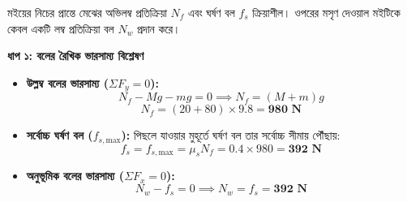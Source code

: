 \documentclass[12pt, a4paper]{article}
\begin{document}
\vspace{1em}


\begin{tcolorbox}[solutionbox={সমাধান (Solution)}]
\noindent
মইয়ের নিচের প্রান্তে মেঝের অভিলম্ব প্রতিক্রিয়া $N_f$ এবং ঘর্ষণ বল $f_s$ ক্রিয়াশীল। ওপরের মসৃণ দেওয়াল মইটিকে কেবল একটি লম্ব প্রতিক্রিয়া বল $N_w$ প্রদান করে।

\vspace{0.5em}
\noindent
\textbf{ধাপ ১: বলের রৈখিক ভারসাম্য বিশ্লেষণ} \\
\begin{itemize}[leftmargin=*, parsep=0.4ex]
    \item \textbf{উল্লম্ব বলের ভারসাম্য ($\Sigma F_y = 0$):}
    $$N_f - M g - m g = 0 \implies N_f = (M + m)g$$ 
    $$N_f = (20 + 80) \times 9.8 = \mathbf{980\text{ N}}$$
    
    \item \textbf{সর্বোচ্চ ঘর্ষণ বল ($f_{s,\text{max}}$):} 
    পিছলে যাওয়ার মুহূর্তে ঘর্ষণ বল তার সর্বোচ্চ সীমায় পৌঁছায়:
    $$f_s = f_{s,\text{max}} = \mu_s N_f = 0.4 \times 980 = \mathbf{392\text{ N}}$$
    
    \item \textbf{অনুভূমিক বলের ভারসাম্য ($\Sigma F_x = 0$):}
    $$N_w - f_s = 0 \implies N_w = f_s = \mathbf{392\text{ N}}$$
\end{itemize}

\vspace{1em}
\begin{center}
\end{center}
\end{tcolorbox}
\end{document}
